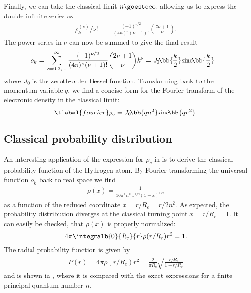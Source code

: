 Finally, we can take the classical limit $n \goesto \infty$, allowing us to express the double infinite series as
\begin{align}
\rho^{(\nu)}_k/\nu! &= \frac{(-1)^{\nu/2}}{(4n)^\nu (\nu+1)!} \binom{2\nu+1}{\nu}.
\end{align}
The power series in $\nu$ can now be summed to give the final result
\begin{align}
\rho_k &= \sum_{\nu=0,2,\dots}^\infty \frac{(-1)^{\nu/2}}{(4n)^\nu (\nu+1)!} \binom{2\nu+1}{\nu} k^\nu = J_0\!\bb{\frac{k}{2}}\text{sinc}\!\bb{\frac{k}{2}}
\end{align}
where $J_0$ is the zeroth-order Bessel function. Transforming back to the momentum variable $q$, we find a concise form for the Fourier transform of the electronic density in the classical limit:
\begin{align} \tlabel{fourier}
\rho_q = J_0\!\bb{q n^2}\text{sinc}\!\bb{q n^2}.
\end{align}

\subsection{Classical probability distribution}
An interesting application of the expression for $\rho_q$ in  is to derive the classical probability function of the Hydrogen atom. By Fourier transforming the universal function $\rho_k$ back to real space we find
\begin{align}
\rho(x)=\frac{1}{16\pi^2\, n^6 \, x^{3/2} (1-x)^{1/2}}
\end{align}
as a function of the reduced coordinate $x=r/R_e=r/2n^2$. As expected, the probability distribution diverges at the classical turning point $x=r/R_e=1$. It can easily be checked, that $\rho(x)$ is properly normalized:
\begin{align}
4\pi \integralb{0}{R_e}{r} \rho(r/R_e) r^2 = 1.
\end{align}
The radial probability function is given by
\begin{align}
P(r)=4\pi \rho(r/R_e) r^2 = \frac{2}{\pi R_e} \sqrt{\frac{r/R_e}{1-r/R_e}}
\end{align}
and is shown in , where it is compared with the exact expressions for a finite principal quantum number $n$.
